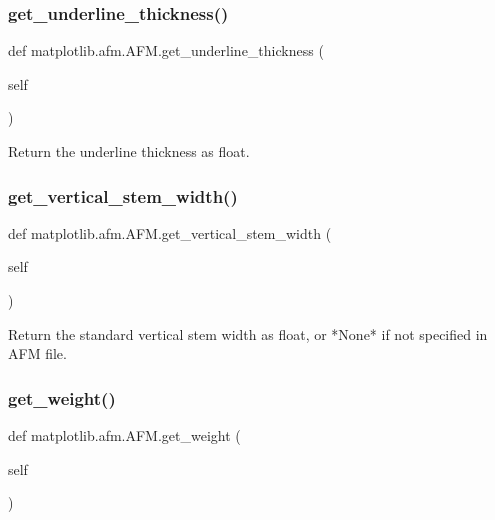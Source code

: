 \subsubsection{\texorpdfstring{get\+\_\+underline\+\_\+thickness()}{get\_underline\_thickness()}}
{\footnotesize\ttfamily def matplotlib.\+afm.\+A\+F\+M.\+get\+\_\+underline\+\_\+thickness (\begin{DoxyParamCaption}\item[{}]{self }\end{DoxyParamCaption})}

\begin{DoxyVerb}Return the underline thickness as float.\end{DoxyVerb}
 \mbox{\label{classmatplotlib_1_1afm_1_1AFM_af9d2666fecd446c7e92dd3e5b3d5a475}} 
\subsubsection{\texorpdfstring{get\+\_\+vertical\+\_\+stem\+\_\+width()}{get\_vertical\_stem\_width()}}
{\footnotesize\ttfamily def matplotlib.\+afm.\+A\+F\+M.\+get\+\_\+vertical\+\_\+stem\+\_\+width (\begin{DoxyParamCaption}\item[{}]{self }\end{DoxyParamCaption})}

\begin{DoxyVerb}Return the standard vertical stem width as float, or *None* if
not specified in AFM file.
\end{DoxyVerb}
 \mbox{\label{classmatplotlib_1_1afm_1_1AFM_a531897e4dfe83cd6938309f58d458996}} 
\subsubsection{\texorpdfstring{get\+\_\+weight()}{get\_weight()}}
{\footnotesize\ttfamily def matplotlib.\+afm.\+A\+F\+M.\+get\+\_\+weight (\begin{DoxyParamCaption}\item[{}]{self }\end{DoxyParamCaption})}

